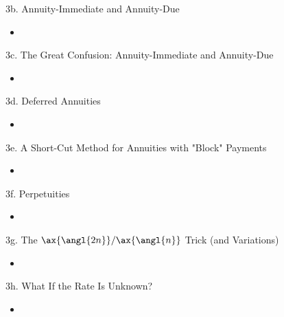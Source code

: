 \begin{CHPT_SUMM_AUTO}[label = {L.-3b}]{3b. Annuity-Immediate and Annuity-Due}
	\begin{itemize}
		\item	
	\end{itemize}
\end{CHPT_SUMM_AUTO}

\begin{CHPT_SUMM_AUTO}[label = {L.-3c}]{3c. The Great Confusion: Annuity-Immediate and Annuity-Due}
	\begin{itemize}
		\item	
	\end{itemize}
\end{CHPT_SUMM_AUTO}

\begin{CHPT_SUMM_AUTO}[label = {L.-3d}]{3d. Deferred Annuities}
	\begin{itemize}
		\item	
	\end{itemize}
\end{CHPT_SUMM_AUTO}

\begin{CHPT_SUMM_AUTO}[label = {L.-3e}]{3e. A Short-Cut Method for Annuities with "Block" Payments}
	\begin{itemize}
		\item	
	\end{itemize}
\end{CHPT_SUMM_AUTO}

\begin{CHPT_SUMM_AUTO}[label = {L.-3f}]{3f. Perpetuities}
	\begin{itemize}
		\item	
	\end{itemize}
\end{CHPT_SUMM_AUTO}

\begin{CHPT_SUMM_AUTO}[label = {L.-3g}]{3g. The $\ax{\angl{2n}} / \ax{\angl{n}}$ Trick (and Variations)}
	\begin{itemize}
		\item	
	\end{itemize}
\end{CHPT_SUMM_AUTO}

\begin{CHPT_SUMM_AUTO}[label = {L.-3h}]{3h. What If the Rate Is Unknown?}
	\begin{itemize}
		\item	
	\end{itemize}
\end{CHPT_SUMM_AUTO}

